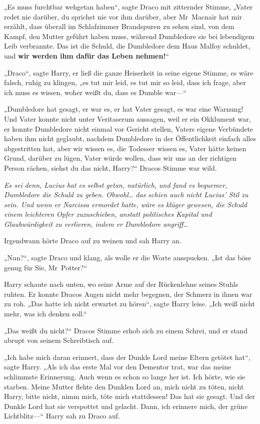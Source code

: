 {„Es muss furchtbar wehgetan haben“, sagte Draco mit zitternder Stimme, „Vater redet nie darüber, du sprichst nie vor ihm darüber, aber Mr~Macnair hat mir erzählt, dass überall im Schlafzimmer Brandspuren zu sehen sind, von dem Kampf, den Mutter geführt haben muss, während Dumbledore sie bei lebendigem Leib verbrannte. Das ist die Schuld, die Dumbledore dem Haus Malfoy schuldet, und \textbf{wir werden ihm dafür das Leben nehmen!}“

„Draco“, sagte Harry, er ließ die ganze Heiserkeit in seine eigene Stimme, es wäre falsch, ruhig zu klingen, „es tut mir leid, es tut mir so leid, dass ich frage, aber ich muss es wissen, woher weißt du, dass es Dumble war—“

„Dumbledore hat gesagt, er war es, er hat Vater gesagt, es war eine Warnung! Und Vater konnte nicht unter Veritaserum aussagen, weil er ein Okklument war, er konnte Dumbledore nicht einmal vor Gericht stellen, Vaters eigene Verbündete haben ihm nicht geglaubt, nachdem Dumbledore in der Öffentlichkeit einfach alles abgestritten hat, aber wir wissen es, die Todesser wissen es, Vater hätte keinen Grund, darüber zu lügen, Vater würde wollen, dass wir uns an der richtigen Person rächen, siehst du das nicht, Harry?“ Dracos Stimme war wild.

\emph{Es sei denn, Lucius hat es selbst getan, natürlich, und fand es bequemer, Dumbledore die Schuld zu geben. Obwohl… das schien auch nicht Lucius' Stil zu sein. Und wenn er Narcissa ermordet hatte, wäre es klüger gewesen, die Schuld einem leichteren Opfer zuzuschieben, anstatt politisches Kapital und Glaubwürdigkeit zu verlieren, indem er Dumbledore angriff…}

Irgendwann hörte Draco auf zu weinen und sah Harry an.

„Nun?“, sagte Draco und klang, als wolle er die Worte ausspucken. „Ist das böse genug für Sie, Mr~Potter?“

Harry schaute nach unten, wo seine Arme auf der Rückenlehne seines Stuhls ruhten. Er konnte Dracos Augen nicht mehr begegnen, der Schmerz in ihnen war zu roh. „Das hatte ich nicht erwartet zu hören“, sagte Harry leise. „Ich weiß nicht mehr, was ich denken soll.“

„Das weißt du nicht?“ Dracos Stimme erhob sich zu einem Schrei, und er stand abrupt von seinem Schreibtisch auf.

„Ich habe mich daran erinnert, dass der Dunkle Lord meine Eltern getötet hat“, sagte Harry. „Als ich das erste Mal vor den Dementor trat, war das meine schlimmste Erinnerung. Auch wenn es schon so lange her ist. Ich hörte, wie sie starben. Meine Mutter flehte den Dunklen Lord an, mich nicht zu töten, nicht Harry, bitte nicht, nimm mich, töte mich stattdessen! Das hat sie gesagt. Und der Dunkle Lord hat sie verspottet und gelacht. Dann, ich erinnere mich, der grüne Lichtblitz—“ Harry sah zu Draco auf.

}
